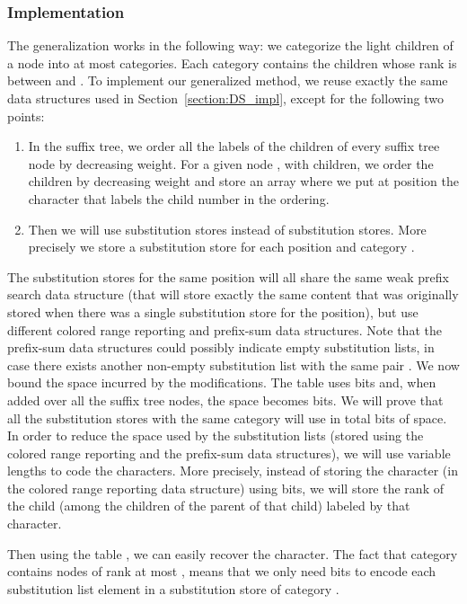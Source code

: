 \documentclass{article}
\newcommand{\?}{\mskip1.5mu}
\begin{document}
\subsubsection{Implementation}
The generalization works in the following way: we categorize the light children of a node into at most  categories. Each category  contains the children whose rank is between  and . 
To implement our generalized method, we reuse exactly the same data structures used in Section~\ref{section:DS_impl}, except for the following two points:
\begin{enumerate}
\item In the suffix tree, we order all the labels of the children of every suffix tree node by decreasing weight. For a given node , with  children, we order the children by decreasing weight and store an array  where we put at position  the character that labels the child number  in the ordering. 
\item Then we will use  substitution stores instead of  substitution stores. More precisely we store a substitution store for each position  and category . 
\end{enumerate}
The  substitution stores for the same position will all share the same weak prefix search data structure (that will store exactly the same content that was originally stored when there was a single substitution store for the position), but use  different  colored range reporting and prefix-sum data structures. Note that the prefix-sum data structures could possibly indicate empty substitution lists, in case there exists another non-empty substitution list with the same pair . 
We now bound the space incurred by the modifications. The table  uses   bits and, when added over all the suffix tree nodes, the space becomes  bits. We will prove that all the substitution stores with the same category  will use in total  bits of space. 
In order to reduce the space used by the substitution lists (stored using the  colored range reporting and the prefix-sum data structures), we will use variable lengths to code the characters. More precisely, instead of storing the character (in the  colored range reporting data structure) using  bits, we will store the rank of the child (among the children of the parent of that child) labeled by that character. 

Then using the table , we can easily recover the character. The fact that category  contains nodes of rank at most , means that we only need  bits to encode each substitution list element in a substitution store of category . 
\end{document}

